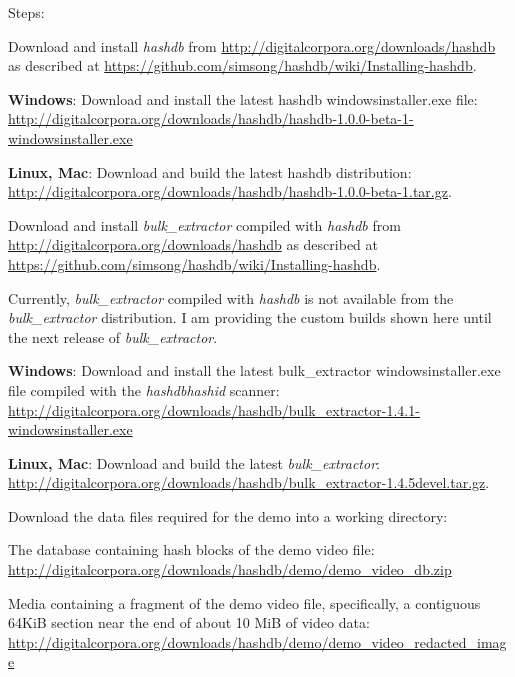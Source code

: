 \documentclass[12pt,twoside]{article}
\newcommand{\hdb}{\emph{hashdb}\xspace}
\newcommand{\bulk}{\emph{bulk\_extractor}\xspace}
\newcommand{\hashid}{\emph{hashid}\xspace}
\begin{document}
Steps:
\begin{compactenum}
\item Download and install \hdb from
\url{http://digitalcorpora.org/downloads/hashdb}
as described at
\url{https://github.com/simsong/hashdb/wiki/Installing-hashdb}.
  \begin{compactitem}
  \item \textbf{Windows}: Download and install the latest hashdb windowsinstaller.exe file:
  \url{http://digitalcorpora.org/downloads/hashdb/hashdb-1.0.0-beta-1-windowsinstaller.exe}
  \item \textbf{Linux, Mac}: Download and build the latest hashdb distribution:
  \url{http://digitalcorpora.org/downloads/hashdb/hashdb-1.0.0-beta-1.tar.gz}.
  \end{compactitem}
\item Download and install \bulk compiled with \hdb from
\url{http://digitalcorpora.org/downloads/hashdb}
as described at
\url{https://github.com/simsong/hashdb/wiki/Installing-hashdb}.

Currently, \bulk compiled with \hdb
is not available from the \bulk distribution.
I am providing the custom builds shown here until the next release of \bulk.
  \begin{compactitem}
  \item \textbf{Windows}: Download and install the latest
  bulk\_extractor windowsinstaller.exe file
  compiled with the \hdb \hashid scanner:
  \url{http://digitalcorpora.org/downloads/hashdb/bulk\_extractor-1.4.1-windowsinstaller.exe}
  \item \textbf{Linux, Mac}: Download and build the latest \bulk:
  \url{http://digitalcorpora.org/downloads/hashdb/bulk\_extractor-1.4.5devel.tar.gz}.
  \end{compactitem}

\item Download the data files required for the demo into a working directory:
  \begin{compactitem}
  \item The database containing hash blocks of the demo video file:
  \url{http://digitalcorpora.org/downloads/hashdb/demo/demo\_video\_db.zip}
  \item Media containing a fragment of the demo video file,
  specifically, a contiguous 64KiB section
  near the end of about 10 MiB of video data:
  \url{http://digitalcorpora.org/downloads/hashdb/demo/demo\_video\_redacted\_image}
  \end{compactitem}


\end{compactenum}
\end{document}
